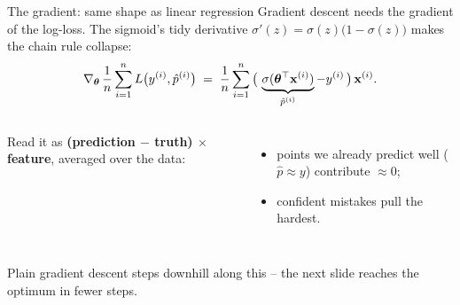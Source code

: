 \documentclass[aspectratio=169]{beamer}
\begin{document}
\begin{frame}{The gradient: same shape as linear regression}
  Gradient descent needs the gradient of the log-loss. The sigmoid's tidy derivative
  $\sigma'(z) = \sigma(z)\big(1-\sigma(z)\big)$ makes the chain rule collapse:
  \[
    \nabla_{\bm{\theta}}\, \frac1n \sum_{i=1}^{n} L\big(y^{(i)}, \hat p^{(i)}\big)
      \;=\; \frac1n \sum_{i=1}^{n} \big(\,\underbrace{\sigma(\bm{\theta}^\top \mathbf{x}^{(i)})}_{\hat p^{(i)}} - y^{(i)}\,\big)\,\mathbf{x}^{(i)} .
  \]
  \begin{columns}[T]
    \small
    Read it as \textbf{(prediction $-$ truth) $\times$ feature}, averaged over the data:
    \begin{itemize}\small
      \item points we already predict well ($\hat p \approx y$) contribute $\approx 0$;
      \item confident mistakes pull the hardest.
    \end{itemize}
  \end{columns}
  \vskip 2pt
  \footnotesize Plain gradient descent steps downhill along this -- the next slide reaches the optimum in fewer steps.
\end{frame}
\end{document}
